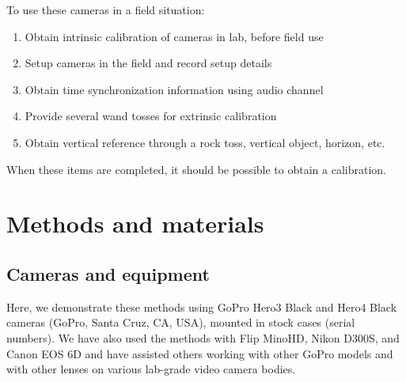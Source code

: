 \documentclass[fleqn,10pt]{wlpeerj}
\begin{document}
To use these cameras in a field situation:
\begin{enumerate}
\item{Obtain intrinsic calibration of cameras in lab, before field use}
\item{Setup cameras in the field and record setup details}
\item{Obtain time synchronization information using audio channel}
\item{Provide several wand tosses for extrinsic calibration}
\item{Obtain vertical reference through a rock toss, vertical object, horizon, etc.}
\end{enumerate}

When these items are completed, it should be possible to obtain a calibration.  

\section*{Methods and materials}
\subsection*{Cameras and equipment}
Here, we demonstrate these methods using GoPro Hero3 Black and Hero4 Black cameras (GoPro, Santa Cruz, CA, USA), mounted in stock cases (serial numbers).  We have also used the methods with Flip MinoHD, Nikon D300S, and Canon EOS 6D and have assisted others working with other GoPro models and with other lenses on various lab-grade video camera bodies.
\end{document}

